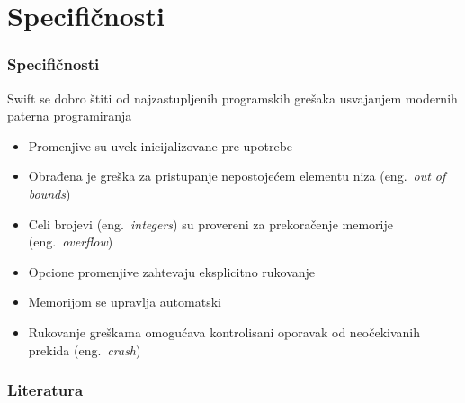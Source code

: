 \documentclass{beamer}
\begin{document}
\section{Specifičnosti}
\begin{frame}
\frametitle{Specifičnosti}

Swift se dobro štiti od najzastupljenih programskih grešaka usvajanjem modernih paterna programiranja \cite{swift_sajt}
\begin{itemize}
\item Promenjive su uvek inicijalizovane pre upotrebe
\item Obrađena je greška za pristupanje nepostojećem elementu niza (eng.~{\em out of bounds})
\item Celi brojevi (eng.~{\em integers}) su provereni za prekoračenje memorije (eng.~{\em overflow})
\item Opcione promenjive zahtevaju eksplicitno rukovanje
\item Memorijom se upravlja automatski
\item Rukovanje greškama omogućava kontrolisani oporavak od neočekivanih prekida (eng.~{\em crash})
\end{itemize}

\end{frame}



\begin{frame}
\frametitle{Literatura}



\end{frame}
\end{document}

